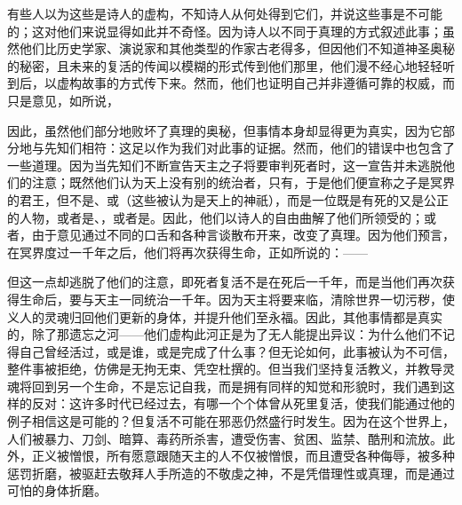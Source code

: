 有些人以为这些是诗人的虚构，不知诗人从何处得到它们，并说这些事是不可能的；这对他们来说显得如此并不奇怪。因为诗人以不同于真理的方式叙述此事；虽然他们比历史学家、演说家和其他类型的作家古老得多，但因他们不知道神圣奥秘的秘密，且未来的复活的传闻以模糊的形式传到他们那里，他们漫不经心地轻轻听到后，以虚构故事的方式传下来。然而，他们也证明自己并非遵循可靠的权威，而只是意见，如所说，\par

\par

因此，虽然他们部分地败坏了真理的奥秘，但事情本身却显得更为真实，因为它部分地与先知们相符：这足以作为我们对此事的证据。然而，他们的错误中也包含了一些道理。因为当先知们不断宣告天主之子将要审判死者时，这一宣告并未逃脱他们的注意；既然他们认为天上没有别的统治者，只有，于是他们便宣称之子是冥界的君王，但不是、或（这些被认为是天上的神祇），而是一位既是有死的又是公正的人物，或者是、，或者是。因此，他们以诗人的自由曲解了他们所领受的；或者，由于意见通过不同的口舌和各种言谈散布开来，改变了真理。因为他们预言，在冥界度过一千年之后，他们将再次获得生命，正如所说的：——\par

\par

但这一点却逃脱了他们的注意，即死者复活不是在死后一千年，而是当他们再次获得生命后，要与天主一同统治一千年。因为天主将要来临，清除世界一切污秽，使义人的灵魂归回他们更新的身体，并提升他们至永福。因此，其他事情都是真实的，除了那遗忘之河——他们虚构此河正是为了无人能提出异议：为什么他们不记得自己曾经活过，或是谁，或是完成了什么事？但无论如何，此事被认为不可信，整件事被拒绝，仿佛是无拘无束、凭空杜撰的。但当我们坚持复活教义，并教导灵魂将回到另一个生命，不是忘记自我，而是拥有同样的知觉和形貌时，我们遇到这样的反对：这许多时代已经过去，有哪一个个体曾从死里复活，使我们能通过他的例子相信这是可能的？但复活不可能在邪恶仍然盛行时发生。因为在这个世界上，人们被暴力、刀剑、暗算、毒药所杀害，遭受伤害、贫困、监禁、酷刑和流放。此外，正义被憎恨，所有愿意跟随天主的人不仅被憎恨，而且遭受各种侮辱，被多种惩罚折磨，被驱赶去敬拜人手所造的不敬虔之神，不是凭借理性或真理，而是通过可怕的身体折磨。\par

